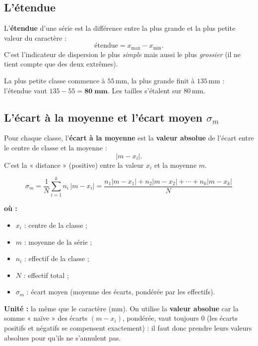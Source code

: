 \documentclass[11pt,a4paper]{article}
\newenvironment{ou}{%
  \par\smallskip\noindent\textbf{où :}\nopagebreak
  \begin{itemize}[leftmargin=1.8em,topsep=2pt,itemsep=1.5pt,parsep=0pt]}%
  {\end{itemize}}
\newcommand{\ecm}{\sigma_m}              %
\begin{document}
\subsection{L'étendue}

\begin{definition}[étendue]
L'\textbf{étendue} d'une série est la différence entre la plus grande et la plus petite valeur du
caractère :
\[ \text{étendue}=x_{\max}-x_{\min}. \]
C'est l'indicateur de dispersion le plus \emph{simple} mais aussi le plus \emph{grossier} (il ne
tient compte que des deux extrêmes).
\end{definition}

\begin{exemple}
La plus petite classe commence à $55$\,mm, la plus grande finit à $135$\,mm : l'étendue vaut
$135-55=\mathbf{80\;\text{mm}}$. Les tailles s'étalent sur $80$\,mm.
\end{exemple}

\subsection{L'écart à la moyenne et l'écart moyen $\ecm$}

\begin{definition}
Pour chaque classe, l'\textbf{écart à la moyenne} est la \textbf{valeur absolue} de l'écart entre le
centre de classe et la moyenne :
\[ |m-x_i|. \]
C'est la « distance » (positive) entre la valeur $x_i$ et la moyenne $m$.
\end{definition}

\begin{formule}[écart moyen $\ecm$]
\[
\boxed{\;\ecm=\dfrac{1}{N}\sum_{i=1}^{k} n_i\,|m-x_i|
      =\dfrac{n_1|m-x_1|+n_2|m-x_2|+\cdots+n_k|m-x_k|}{N}\;}
\]
\begin{ou}
  \item $x_i$ : centre de la classe ;
  \item $m$ : moyenne de la série ;
  \item $n_i$ : effectif de la classe ;
  \item $N$ : effectif total ;
  \item $\ecm$ : écart moyen (moyenne des écarts, pondérée par les effectifs).
\end{ou}
\textbf{Unité :} la même que le caractère (mm). On utilise la \textbf{valeur absolue} car la somme
« naïve » des écarts $(m-x_i)$, pondérée, vaut toujours $0$ (les écarts positifs et négatifs se
compensent exactement) : il faut donc prendre leurs valeurs absolues pour qu'ils ne s'annulent pas.
\end{formule}
\end{document}
